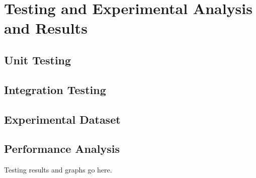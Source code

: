\chapter{Testing and Experimental Analysis and Results}
\section{Unit Testing}
\section{Integration Testing}
\section{Experimental Dataset}
\section{Performance Analysis}

Testing results and graphs go here.
